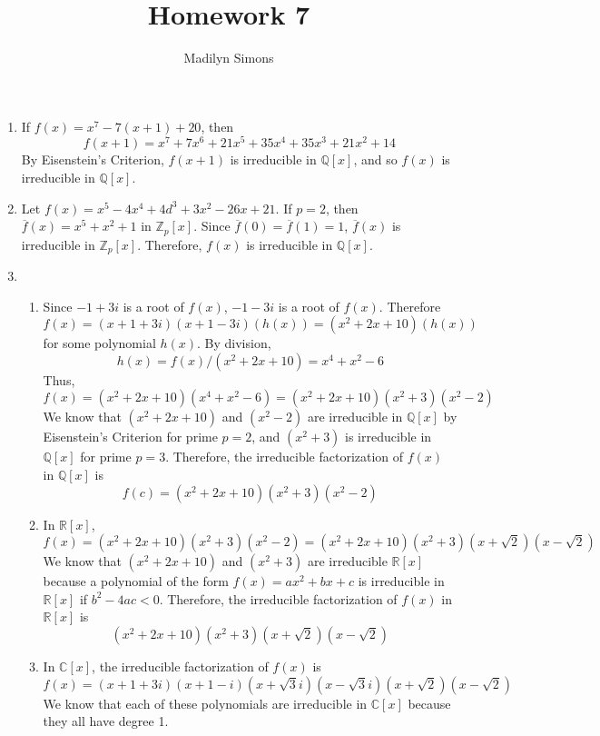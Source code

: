\documentclass{article}
\title{Homework 7}
\author{Madilyn Simons}
\date{}
\begin{document}
\maketitle

\begin{enumerate}

\item If $f(x) = x^7 - 7(x+1) + 20$, then
\[
f(x+1) = x^7 + 7x^6 + 21x^5 + 35x^4 + 35x^3 + 21x^2 + 14
\]
By Eisenstein's Criterion, $f(x + 1)$ is irreducible in $\mathbb{Q}[x]$, and so
$f(x)$ is irreducible in $\mathbb{Q}[x]$.

\item Let $f(x) = x^5 - 4x^4 + 4d^3 + 3x^2 -26x + 21$.
If $p = 2$, then $\overline{f}(x) = x^5 + x^2 + 1$ in $\mathbb{Z}_{p}[x]$.
Since $\overline{f}(0) = \overline{f}(1) = 1$, $\overline{f}(x)$ is
irreducible in $\mathbb{Z}_{p}[x]$.  Therefore, $f(x)$ is
irreducible in $\mathbb{Q}[x]$.

\item
\begin{enumerate}
\item
Since $-1 + 3i$ is a root of $f(x)$, $-1 - 3i$ is a root of $f(x)$.
Therefore
\[
f(x) = (x + 1 + 3i)(x + 1 - 3i)(h(x)) = (x^2 + 2x + 10)(h(x))
\] for
some polynomial $h(x)$.
By division,
\[h(x) = f(x) / (x^2 + 2x + 10) = x^4 + x^2 - 6
\]
Thus,
\[f(x) = (x^2 + 2x + 10)(x^4 + x^2 - 6) = (x^2 + 2x + 10)(x^2 + 3)(x^2 - 2)
\]
We know that $(x^2 + 2x + 10)$ and $(x^2 - 2)$ are irreducible in $\mathbb{Q}[x]$
by Eisenstein's Criterion for prime $p = 2$, and $(x^2 + 3)$ is irreducible
in $\mathbb{Q}[x]$ for prime $p = 3$.  Therefore, the irreducible
factorization of $f(x)$ in $\mathbb{Q}[x]$ is
\[
f(c) = (x^2 + 2x + 10)(x^2 + 3)(x^2 - 2)
\]

\item
In $\mathbb{R}[x]$,
\[f(x) = (x^2 + 2x + 10)(x^2 + 3)(x^2 - 2)
= (x^2 + 2x + 10)(x^2 + 3)(x + \sqrt{2})(x - \sqrt{2})
\]
We know that $(x^2 + 2x + 10)$ and $(x^2 + 3)$ are irreducible $\mathbb{R}[x]$
because a polynomial of the form $f(x) = ax^2 + bx + c$ is irreducible in
$\mathbb{R}[x]$ if $b^2 - 4ac < 0$.  Therefore, the irreducible factorization
of $f(x)$ in $\mathbb{R}[x]$ is
\[
(x^2 + 2x + 10)(x^2 + 3)(x + \sqrt{2})(x - \sqrt{2})
\]

\item
In $\mathbb{C}[x]$, the irreducible factorization of $f(x)$ is
\[
f(x) = (x + 1 + 3i)(x + 1 - i)(x + \sqrt{3}i)(x - \sqrt{3}i)(x + \sqrt{2})(x - \sqrt{2})
\]
We know that each of these polynomials are irreducible in $\mathbb{C}[x]$ because
they all have degree 1.

\end{enumerate}
\end{enumerate}
\end{document}
